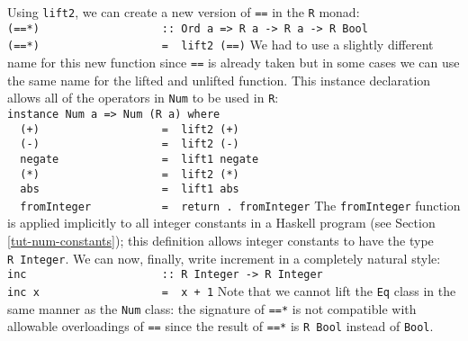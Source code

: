 Using \mbox{\tt lift2}, we can create a new version of \mbox{\tt ==} in the \mbox{\tt R} monad:
\bprog
\mbox{\tt (==*)\ \ \ \ \ \ \ \ \ \ \ \ \ \ \ \ \ \ \ ::\ Ord\ a\ =>\ R\ a\ ->\ R\ a\ ->\ R\ Bool}\\
\mbox{\tt (==*)\ \ \ \ \ \ \ \ \ \ \ \ \ \ \ \ \ \ \ =\ \ lift2\ (==)}
\eprog
We had to use a slightly different name for this new function since
\mbox{\tt ==} is already taken but in
some cases we can use the same name for the lifted and unlifted
function.  This instance declaration allows 
all of the operators in \mbox{\tt Num} to be used in \mbox{\tt R}:
\bprog
\mbox{\tt instance\ Num\ a\ =>\ Num\ (R\ a)\ where}\\
\mbox{\tt \ \ (+)\ \ \ \ \ \ \ \ \ \ \ \ \ \ \ \ \ \ \ =\ \ lift2\ (+)}\\
\mbox{\tt \ \ (-)\ \ \ \ \ \ \ \ \ \ \ \ \ \ \ \ \ \ \ =\ \ lift2\ (-)}\\
\mbox{\tt \ \ negate\ \ \ \ \ \ \ \ \ \ \ \ \ \ \ \ =\ \ lift1\ negate}\\
\mbox{\tt \ \ (*)\ \ \ \ \ \ \ \ \ \ \ \ \ \ \ \ \ \ \ =\ \ lift2\ (*)}\\
\mbox{\tt \ \ abs\ \ \ \ \ \ \ \ \ \ \ \ \ \ \ \ \ \ \ =\ \ lift1\ abs}\\
\mbox{\tt \ \ fromInteger\ \ \ \ \ \ \ \ \ \ \ =\ \ return\ .\ fromInteger}
\eprog
The \mbox{\tt fromInteger} function is applied implicitly to all integer
constants in a Haskell program (see Section \ref{tut-num-constants});
this definition allows integer constants to have the type \mbox{\tt R\ Integer}.
We can now, finally, write increment in a completely natural style:
\bprog
\mbox{\tt inc\ \ \ \ \ \ \ \ \ \ \ \ \ \ \ \ \ \ \ \ \ ::\ R\ Integer\ ->\ R\ Integer}\\
\mbox{\tt inc\ x\ \ \ \ \ \ \ \ \ \ \ \ \ \ \ \ \ \ \ =\ \ x\ +\ 1}
\eprog
Note that we cannot lift the \mbox{\tt Eq} class in the same manner as the
\mbox{\tt Num} class: the signature of \mbox{\tt ==*} is not compatible with allowable
overloadings of \mbox{\tt ==} since the result of \mbox{\tt ==*} is \mbox{\tt R\ Bool} instead of
\mbox{\tt Bool}.

